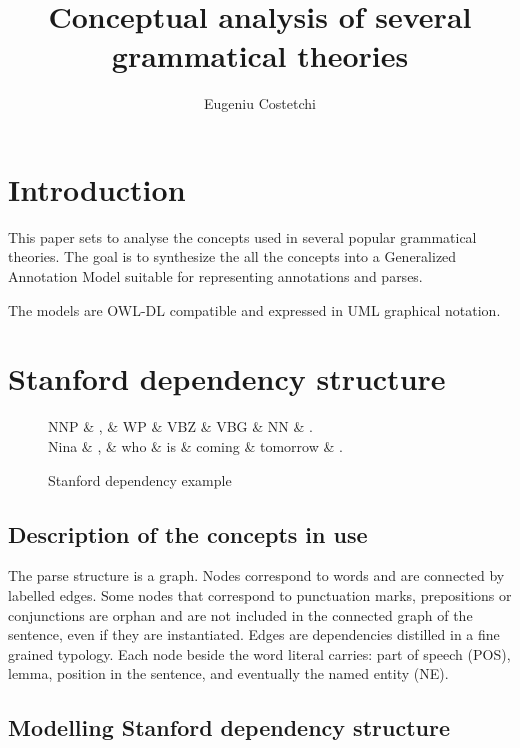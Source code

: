 \documentclass[11pt,a4paper,titlepage]{article}
\author{Eugeniu Costetchi}
\title{Conceptual analysis of several grammatical theories}
\begin{document}
\maketitle
\section{Introduction}
This paper sets to analyse the concepts used in several popular grammatical theories. The goal is to synthesize the all the concepts into a Generalized Annotation Model suitable for representing annotations and parses.

The models are OWL-DL compatible and expressed in UML graphical notation.

\section{Stanford dependency structure}
\label{sec:sds}
\begin{figure}[H]
	\centering
	\begin{dependency}
		\begin{deptext}[]
			NNP \& , \& WP \& VBZ \& VBG \& NN \& . \\
			Nina \& , \& who \& is \& coming \& tomorrow \& . \\ %
		\end{deptext}
	\end{dependency}
	\label{fig:dep1}
	\caption{Stanford dependency example}
\end{figure}

\subsection{Description of the concepts in use}
The parse structure is a graph. Nodes correspond to words and are connected by labelled edges. Some nodes that correspond to punctuation marks, prepositions or conjunctions are orphan and are not included in the connected graph of the sentence, even if they are instantiated. Edges are dependencies distilled in a fine grained typology. Each node beside the word literal carries: part of speech (POS), lemma, position in the sentence, and eventually the named entity (NE).

\subsection{Modelling Stanford dependency structure}
\end{document}

